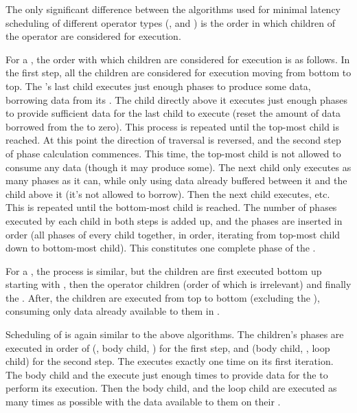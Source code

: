 The only significant difference between the algorithms used for
minimal latency scheduling of different operator types
({\pipeline}, {\splitjoin} and {\feedbackloop}) is the order in
which children of the operator are considered for execution.

For a {\pipeline}, the order with which children are considered
for execution is as follows.  In the first step, all the children
are considered for execution moving from bottom to top. The
{\pipeline}'s last child executes just enough phases to produce
some data, borrowing data from its {\Input} {\Channel}. The child
directly above it executes just enough phases to provide
sufficient data for the last child to execute (reset the amount of
data borrowed from the {\Channel} to zero). This process is
repeated until the top-most child is reached. At this point the
direction of traversal is reversed, and the second step of phase
calculation commences. This time, the top-most child is not
allowed to consume any data (though it may produce some). The next
child only executes as many phases as it can, while only using
data already buffered between it and the child above it (it's not
allowed to borrow). Then the next child executes, etc. This is
repeated until the bottom-most child is reached. The number of
phases executed by each child in both steps is added up, and the
phases are inserted in order (all phases of every child together,
in order, iterating from top-most child down to bottom-most
child). This constitutes one complete phase of the {\pipeline}.

For a {\splitjoin}, the process is similar, but the children are
first executed bottom up starting with {\joiner}, then the
operator children (order of which is irrelevant) and finally the
{\splitter}. After, the children are executed from top to bottom
(excluding the {\splitter}), consuming only data already available
to them in {\Channels}.

Scheduling of {\feedbackloops} is again similar to the above
algorithms.  The children's phases are executed in order of
({\splitter}, body child, {\joiner}) for the first step, and (body
child, {\splitter}, loop child) for the second step.  The
{\splitter} executes exactly one time on its first iteration.  The
body child and the {\joiner} execute just enough times to provide
data for the {\splitter} to perform its execution. Then the body
child, {\splitter} and the loop child are executed as many times
as possible with the data available to them on their {\Input}
{\Channels}.

